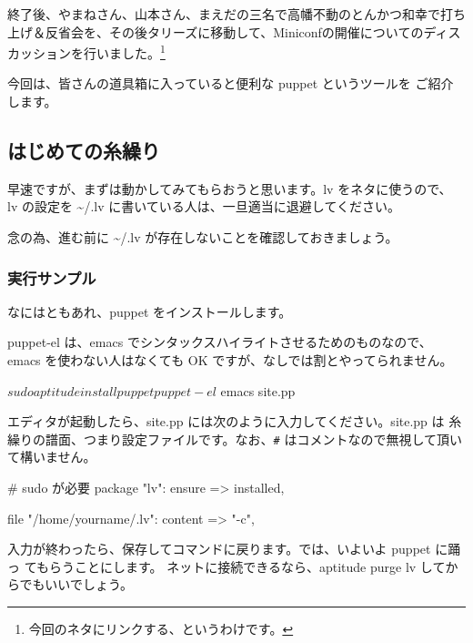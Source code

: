 \documentclass[mingoth,a4paper]{jsarticle}
\begin{document}
終了後、やまねさん、山本さん、まえだの三名で高幡不動のとんかつ和幸で打ち
上げ＆反省会を、その後タリーズに移動して、Miniconfの開催についてのディス
カッションを行いました。\footnote{今回のネタにリンクする、というわけです。}



今回は、皆さんの道具箱に入っていると便利な puppet というツールを
ご紹介します。

\subsection{はじめての糸繰り}

早速ですが、まずは動かしてみてもらおうと思います。lv をネタに使うので、
lv の設定を \textasciitilde /.lv に書いている人は、一旦適当に退避してください。

念の為、進む前に \textasciitilde /.lv が存在しないことを確認しておきましょう。

\subsubsection{実行サンプル}

なにはともあれ、puppet をインストールします。

puppet-el は、emacs でシンタックスハイライトさせるためのものなので、
emacs を使わない人はなくても OK ですが、なしでは割とやってられません。

\begin{commandline}
$ sudo aptitude install puppet puppet-el
$ emacs site.pp 
\end{commandline}

エディタが起動したら、site.pp には次のように入力してください。site.pp は
糸繰りの譜面、つまり設定ファイルです。なお、{\tt \#} はコメントなので無視して頂いて構いません。

\begin{commandline}
  # sudo が必要
  package { "lv":
    ensure => installed,
  }

  file { "/home/yourname/.lv":
    content => "-c",
  }
\end{commandline}

入力が終わったら、保存してコマンドに戻ります。では、いよいよ puppet に踊っ
てもらうことにします。
ネットに接続できるなら、aptitude purge lv してからでもいいでしょう。
\end{document}
